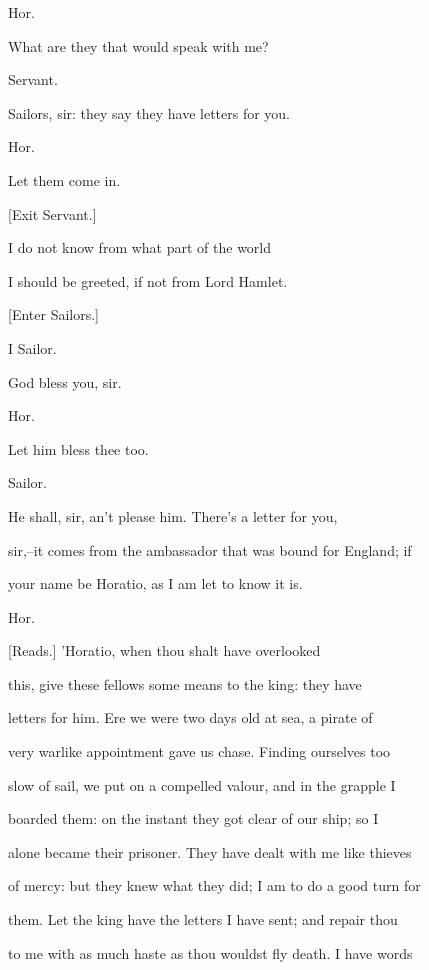 \documentclass[12pt]{book}
\begin{document}
Hor.

What are they that would speak with me?



Servant.

Sailors, sir: they say they have letters for you.



Hor.

Let them come in.



[Exit Servant.]



I do not know from what part of the world

I should be greeted, if not from Lord Hamlet.



[Enter Sailors.]



I Sailor.

God bless you, sir.



Hor.

Let him bless thee too.



Sailor.

He shall, sir, an't please him. There's a letter for you,

sir,--it comes from the ambassador that was bound for England; if

your name be Horatio, as I am let to know it is.



Hor.

[Reads.] 'Horatio, when thou shalt have overlooked

this, give these fellows some means to the king: they have

letters for him. Ere we were two days old at sea, a pirate of

very warlike appointment gave us chase. Finding ourselves too

slow of sail, we put on a compelled valour, and in the grapple I

boarded them: on the instant they got clear of our ship; so I

alone became their prisoner. They have dealt with me like thieves

of mercy: but they knew what they did; I am to do a good turn for

them. Let the king have the letters I have sent; and repair thou

to me with as much haste as thou wouldst fly death. I have words
\end{document}
